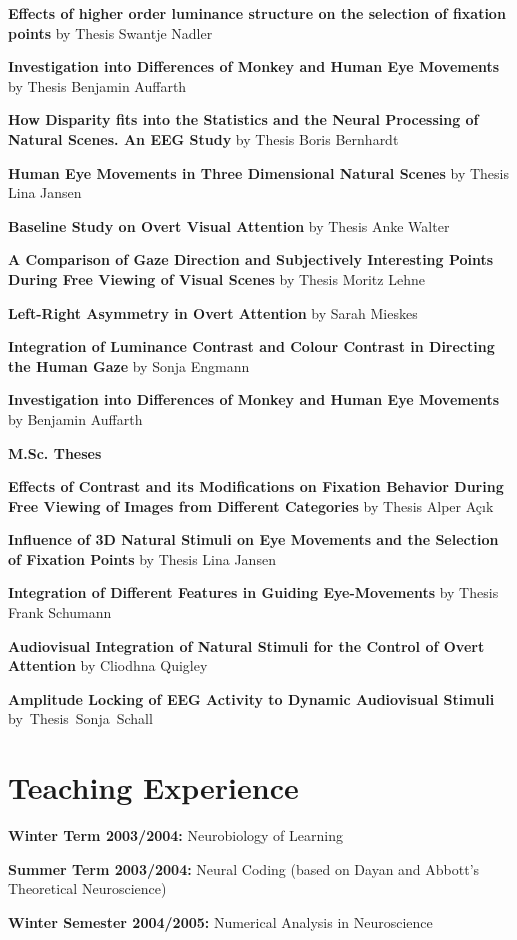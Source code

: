 \textbf{Effects of higher order luminance structure on the 
selection of fixation points} by Thesis Swantje Nadler

\textbf{Investigation into Differences of Monkey and Human Eye Movements}
by Thesis Benjamin Auffarth 

\textbf{How Disparity fits into the Statistics and the Neural Processing of
Natural Scenes. An EEG Study} by Thesis Boris Bernhardt

\textbf{Human Eye Movements in Three Dimensional Natural Scenes} by
Thesis Lina Jansen

\textbf{Baseline Study on Overt Visual Attention} by Thesis Anke Walter

\textbf{A Comparison of Gaze Direction and Subjectively Interesting Points
During Free Viewing of Visual Scenes} by Thesis Moritz Lehne 

\textbf{Left-Right Asymmetry in Overt Attention} by Sarah Mieskes

\textbf{Integration of Luminance Contrast and Colour Contrast in Directing
the Human Gaze} by Sonja Engmann

\textbf{Investigation into Differences of Monkey and Human Eye Movements}
by Benjamin Auffarth

\textbf{M.Sc. Theses}

\textbf{Effects of Contrast and its Modifications on Fixation Behavior 
During Free Viewing of Images from Different Categories} by Thesis Alper
A\c{c}{\i}k 

\textbf{Influence of 3D Natural Stimuli on Eye Movements and the Selection
of Fixation Points} by Thesis Lina Jansen

\textbf{Integration of Different Features in Guiding Eye-Movements} by
Thesis Frank Schumann 

\textbf{Audiovisual Integration of Natural Stimuli for the Control of Overt
Attention} by Cliodhna Quigley

\textbf{Amplitude Locking of EEG Activity to Dynamic Audiovisual
Stimuli} by~Thesis~Sonja~Schall 

\section*{Teaching Experience}

\textbf{Winter Term 2003/2004:} Neurobiology of Learning 

\textbf{Summer Term 2003/2004:} Neural Coding (based on Dayan and Abbott's
Theoretical Neuroscience)

\textbf{Winter Semester 2004/2005:} Numerical Analysis in Neuroscience

